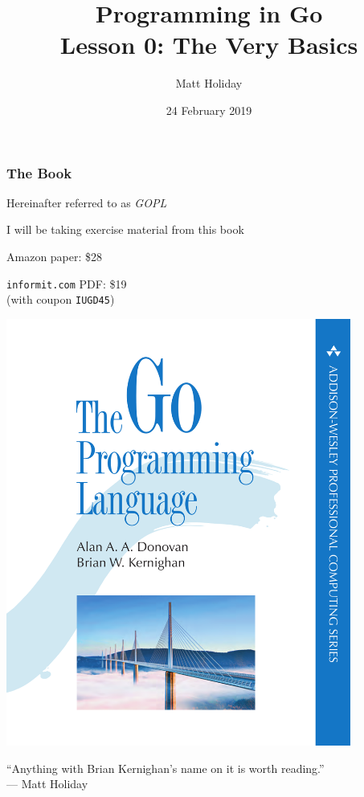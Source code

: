 \documentclass[handout,compress,t,11pt]{beamer}
\title[Programming in Go]{\bf Programming in Go\\ Lesson 0: The Very Basics}
\author{Matt Holiday}
\institute[CP]{Cardinal Peak}
\date{24 February 2019}
\begin{document}
\frame{\titlepage} 

\begin{frame}[fragile]
    \frametitle{The Book}
    Hereinafter referred to as {\em GOPL} \par
    \vspace{0.4\baselineskip}
    \begin{minipage}[c]{0.55\textwidth}
        I will be taking exercise material 
        from this book \par
        \vspace{\baselineskip}
        
    Amazon paper: \$28 \par
    \vspace{\baselineskip}
    \verb|informit.com| PDF: \$19 \\
    (with coupon \verb|IUGD45|)
    \end{minipage}%
    \begin{minipage}[c]{0.35\textwidth}
        \vspace{0.5\baselineskip}
        \hfill \includegraphics[width=0.85\textwidth,height=.5\textheight]{cover}
    \end{minipage} \par
    \vspace{2\baselineskip}
    ``Anything with Brian Kernighan's name on it is worth reading.'' \\--- Matt Holiday
\end{frame}
\end{document}

